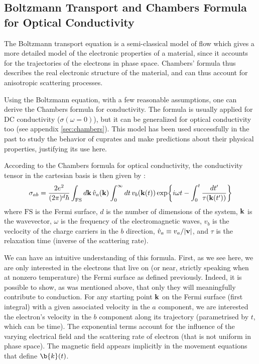 \subsection{Boltzmann Transport and Chambers Formula for Optical Conductivity}
The Boltzmann transport equation is a semi-classical model of flow 
which gives a more detailed model of the electronic properties of a material, 
since it accounts for the trajectories of the electrons in phase space. 
Chambers' formula thus describes the real electronic structure of the material, 
and can thus account for anisotropic scattering processes.

Using the Boltzmann equation, with a few reasonable assumptions, 
one can derive the Chambers formula for conductivity. 
The formula is usually applied for DC conductivity ($\sigma(\omega=0)$), 
but it can be generalized for optical conductivity too (see appendix \ref{sec:chambers}).
This model has been used successfully in the past to study the behavior of cuprates 
and make predictions about their physical properties\cite{grissonnanche2021, grissonnanche2024, fang2022, gourgout2022, ataei2022}, 
justifying its use here.

According to the Chambers formula for optical conductivity, 
the conductivity tensor in the cartesian basis is then given by :
\begin{equation}
	\sigma_{ab} = \frac{2e^2}{(2\pi)^d\hbar}\int_{\mathrm{FS}}\dd{\vb{k}}\hat{v}_a(\vb{k})
        \int_0^{\infty}\dd{t}v_b(\vb{k}(t))\exp{i\omega t
        - \int_0^t \frac{\mathop{dt'}}{\tau(\vb{k}(t'))}}
\end{equation}
where $\mathrm{FS}$ is the Fermi surface, $d$ is the number of dimensions of the system, $\vb{k}$ is the
wavevector, $\omega$ is the frequency of the electromagnetic waves, $v_b$ is the veclocity of the
charge carriers in the $b$ direction, $\hat{v}_a\equiv v_a/\abs{\vb{v}}$, and $\tau$ is the
relaxation time (inverse of the scattering rate). 

We can have an intuitive understanding of this formula. 
First, as we see here, we are only interested in the electrons that live on (or near, strictly speaking when at nonzero temperature) the Fermi surface as defined previously. 
Indeed, it is possible to show, as was mentioned above, that only they will meaningfully contribute to conduction. 
For any starting point $\vb{k}$ on the Fermi surface (first integral) with a given associated velocity in the $a$ component, 
we are interested the electron's velocity in the $b$ component along its trajectory (parametrised by $t$,  which can be time). 
The exponential terms account for the influence of the varying electrical field and the scattering rate of electron (that is not uniform in phase space). 
The magnetic field appears implicitly in the movement equations that define $\b{k}(t)$.

